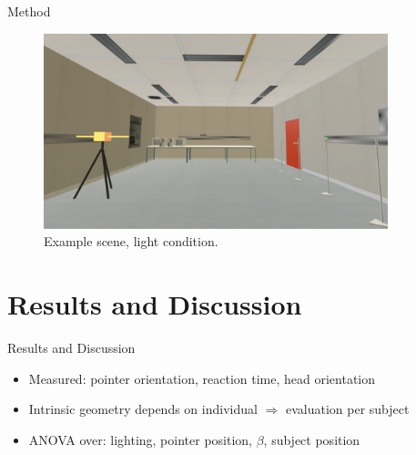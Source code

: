 \documentclass{beamer}
\begin{document}
\begin{frame}{Method}
    \begin{minipage}{10cm}
        \begin{figure}
            \centering
            \includegraphics[width = 10cm]{Images/SzenenBeispiel.png}
            \caption{Example scene, light condition.}
            \label{ExSzeneLight}
        \end{figure}
    \end{minipage}
\end{frame}

\section{Results and Discussion}
\begin{frame}{Results and Discussion}
    \begin{itemize}
        \item Measured: pointer orientation, reaction time, head orientation 
        \item Intrinsic geometry depends on individual $\Rightarrow$ evaluation per subject
        \item ANOVA over: lighting, pointer position, $\beta$, subject position
    \end{itemize}
\end{frame}
\end{document}
